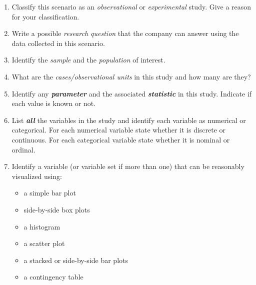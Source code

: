 \documentclass[
  letterpaper,
  DIV=11,
  numbers=noendperiod]{scrartcl}
\providecommand{\tightlist}{%
  \setlength{\itemsep}{0pt}\setlength{\parskip}{0pt}}\usepackage{longtable,booktabs,array}
\begin{document}
\begin{enumerate}
\def\labelenumi{\alph{enumi}.}
\item
  Classify this scenario as an \emph{observational} or
  \emph{experimental} study. Give a reason for your classification.
  \vspace{2cm}
\item
  Write a possible \emph{research question} that the company can answer
  using the data collected in this scenario. \vspace{2cm}
\item
  Identify the \emph{sample} and the \emph{population} of interest.
  \vspace{2cm}
\item
  What are the \emph{cases/observational units} in this study and how
  many are they? \vspace{2cm}
\item
  Identify any \textbf{\emph{parameter}} and the associated
  \textbf{\emph{statistic}} in this study. Indicate if each value is
  known or not. \vspace{2cm}
\item
  List \textbf{\emph{all}} the variables in the study and identify each
  variable as numerical or categorical. For each numerical variable
  state whether it is discrete or continuous. For each categorical
  variable state whether it is nominal or ordinal. \vspace{6cm}
\item
  Identify a variable (or variable set if more than one) that can be
  reasonably visualized using:

  \begin{itemize}
  \tightlist
  \item
    a simple bar plot \vspace{1cm}
  \item
    side-by-side box plots \vspace{1cm}
  \item
    a histogram \vspace{1cm}
  \item
    a scatter plot \vspace{1cm}
  \item
    a stacked or side-by-side bar plots \vspace{1cm}
  \item
    a contingency table \vspace{1cm} \clearpage
  \end{itemize}
\end{enumerate}
\end{document}
